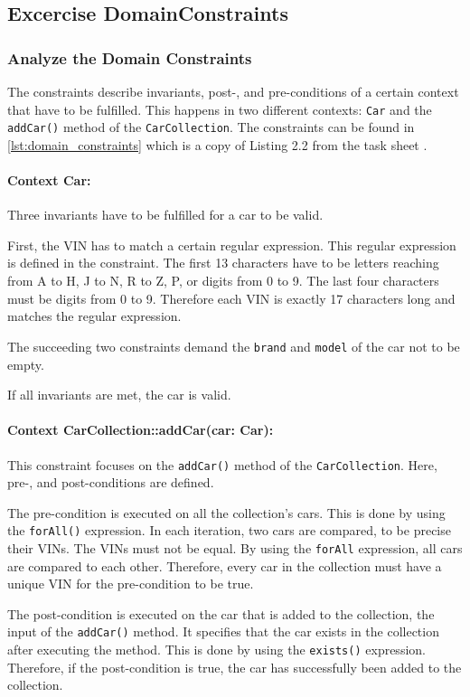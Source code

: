 \subsection{Excercise DomainConstraints}
\subsubsection*{Analyze the Domain Constraints}
The constraints describe invariants, post-, and pre-conditions of a certain context that have to be fulfilled.
This happens in two different contexts: \texttt{Car} and the \texttt{addCar()} method of the \texttt{CarCollection}.
The constraints can be found in \autoref{lst:domain_constraints} which is a copy of Listing 2.2 from the task sheet \cite{CM-T-DMC}.

\paragraph*{Context Car:}
Three invariants have to be fulfilled for a car to be valid.

First, the VIN has to match a certain regular expression.
This regular expression is defined in the constraint.
The first 13 characters have to be letters reaching from A to H, J to N, R to Z, P, or digits from 0 to 9.
The last four characters must be digits from 0 to 9.
Therefore each VIN is exactly 17 characters long and matches the regular expression.

The succeeding two constraints demand the \texttt{brand} and \texttt{model} of the car not to be empty.

If all invariants are met, the car is valid.

\paragraph*{Context CarCollection::addCar(car: Car):}
This constraint focuses on the \texttt{addCar()} method of the \texttt{CarCollection}.
Here, pre-, and post-conditions are defined.

The pre-condition is executed on all the collection's cars.
This is done by using the \texttt{forAll()} expression.
In each iteration, two cars are compared, to be precise their VINs.
The VINs must not be equal.
By using the \texttt{forAll} expression, all cars are compared to each other.
Therefore, every car in the collection must have a unique VIN for the pre-condition to be true.

The post-condition is executed on the car that is added to the collection, the input of the \texttt{addCar()} method.
It specifies that the car exists in the collection after executing the method.
This is done by using the \texttt{exists()} expression.
Therefore, if the post-condition is true, the car has successfully been added to the collection.

